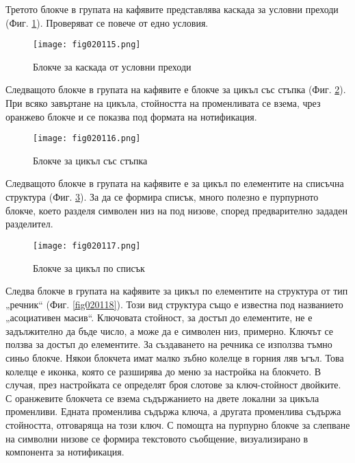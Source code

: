 Третото блокче в групата на кафявите представлява каскада за условни преходи (Фиг. \ref{fig020115}). Проверяват се повече от едно условия.

\begin{figure}[H]
  \centering
  \texttt{[image: fig020115.png]}
  \caption{Блокче за каскада от условни преходи}
\label{fig020115}
\end{figure}

Следващото блокче в групата на кафявите е блокче за цикъл със стъпка (Фиг. \ref{fig020116}). При всяко завъртане на цикъла, стойността на променливата се взема, чрез оранжево блокче и се показва под формата на нотификация. 

\begin{figure}[H]
  \centering
  \texttt{[image: fig020116.png]}
  \caption{Блокче за цикъл със стъпка}
\label{fig020116}
\end{figure}

Следващото блокче в групата на кафявите е за цикъл по елементите на списъчна структура (Фиг. \ref{fig020117}). За да се формира списък, много полезно е пурпурното блокче, което разделя символен низ на под низове, според предварително зададен разделител. 

\begin{figure}[H]
  \centering
  \texttt{[image: fig020117.png]}
  \caption{Блокче за цикъл по списък}
\label{fig020117}
\end{figure}

Следва блокче в групата на кафявите за цикъл по елементите на структура от тип „речник“ (Фиг. \ref{fig020118}). Този вид структура също е известна под названието „асоциативен масив“. Ключовата стойност, за достъп до елементите, не е задължително да бъде число, а може да е символен низ, примерно. Ключът се ползва за достъп до елементите. За създаването на речника се използва тъмно синьо блокче. Някои блокчета имат малко зъбно колелце в горния ляв ъгъл. Това колелце е иконка, която се разширява до меню за настройка на блокчето. В случая, през настройката се определят броя слотове за ключ-стойност двойките. С оранжевите блокчета се взема съдържанието на двете локални за цикъла променливи. Едната променлива съдържа ключа, а другата променлива съдържа стойността, отговаряща на този ключ. С помощта на пурпурно блокче за слепване на символни низове се формира текстовото съобщение, визуализирано в компонента за нотификация. 


